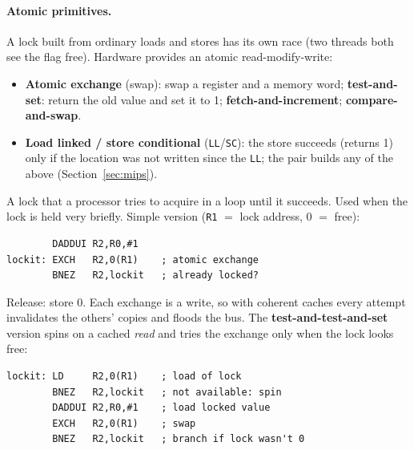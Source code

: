\paragraph{Atomic primitives.} A lock built from ordinary loads and stores has its
own race (two threads both see the flag free). Hardware provides an atomic
read-modify-write:
\begin{itemize}
  \item \textbf{Atomic exchange} (swap): swap a register and a memory word;
  \textbf{test-and-set}: return the old value and set it to 1;
  \textbf{fetch-and-increment}; \textbf{compare-and-swap}.
  \item \textbf{Load linked / store conditional} (\texttt{LL}/\texttt{SC}): the
  store succeeds (returns 1) only if the location was not written since the
  \texttt{LL}; the pair builds any of the above (Section~\ref{sec:mips}).
\end{itemize}

\begin{definition}
A lock that a processor tries to acquire in a loop until it succeeds. Used when the
lock is held very briefly. Simple version (\texttt{R1} $=$ lock address, 0 $=$ free):
\begin{lstlisting}
        DADDUI R2,R0,#1
lockit: EXCH   R2,0(R1)    ; atomic exchange
        BNEZ   R2,lockit   ; already locked?
\end{lstlisting}
Release: store 0. Each exchange is a write, so with coherent caches every attempt
invalidates the others' copies and floods the bus. The \textbf{test-and-test-and-set}
version spins on a cached \emph{read} and tries the exchange only when the lock
looks free:
\begin{lstlisting}
lockit: LD     R2,0(R1)    ; load of lock
        BNEZ   R2,lockit   ; not available: spin
        DADDUI R2,R0,#1    ; load locked value
        EXCH   R2,0(R1)    ; swap
        BNEZ   R2,lockit   ; branch if lock wasn't 0
\end{lstlisting}
\end{definition}

